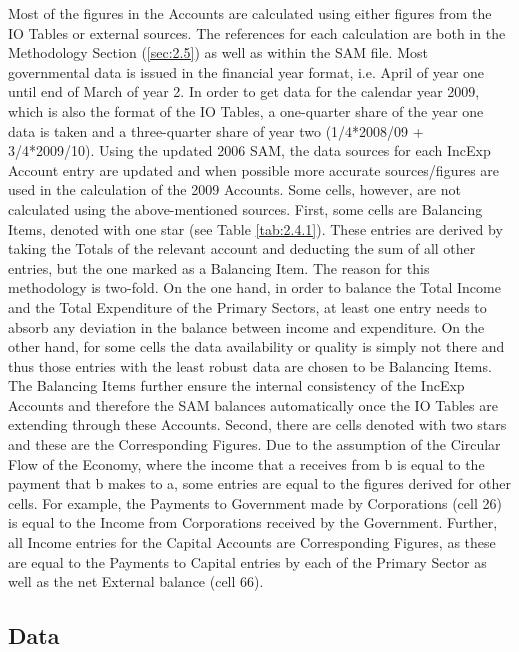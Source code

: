 Most of the figures in the Accounts are calculated using either figures from the IO Tables or external sources. The references for each calculation are both in the Methodology Section  (\ref{sec:2.5}) as well as within the SAM file. Most governmental data is issued in the financial year format, i.e. April of year one until end of March of year 2. In order to get data for the calendar year 2009, which is also the format of the IO Tables, a one-quarter share of the year one data is taken and a three-quarter share of year two (1/4*2008/09 + 3/4*2009/10). Using the updated 2006 SAM, the data sources for each IncExp Account entry are updated and when possible more accurate sources/figures are used in the calculation of the 2009 Accounts.
Some cells, however, are not calculated using the above-mentioned sources. First, some cells are Balancing Items, denoted with one star (see Table \ref{tab:2.4.1}). These entries are derived by taking the Totals of the relevant account and deducting the sum of all other entries, but the one marked as a Balancing Item. The reason for this methodology is two-fold. On the one hand, in order to balance the Total Income and the Total Expenditure of the Primary Sectors, at least one entry needs to absorb any deviation in the balance between income and expenditure. On the other hand, for some cells the data availability or quality is simply not there and thus those entries with the least robust data are chosen to be Balancing Items. The Balancing Items further ensure the internal consistency of the IncExp Accounts and therefore the SAM balances automatically once the IO Tables are extending through these Accounts. Second, there are cells denoted with two stars and these are the Corresponding Figures. Due to the assumption of the Circular Flow of the Economy, where the income that a receives from b is equal to the payment that b makes to a, some entries are equal to the figures derived for other cells. For example, the Payments to Government made by Corporations (cell 26) is equal to the Income from Corporations received by the Government. Further, all Income entries for the Capital Accounts are Corresponding Figures, as these are equal to the Payments to Capital entries by each of the Primary Sector as well as the net External balance (cell 66). 


\subsection{Data}
\label{sec:2.4.3}

